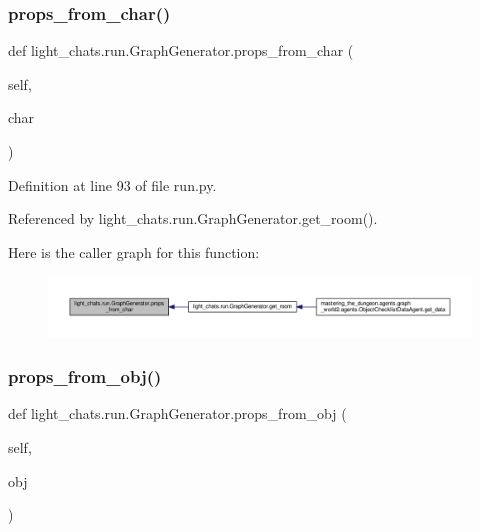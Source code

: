 \subsubsection{\texorpdfstring{props\+\_\+from\+\_\+char()}{props\_from\_char()}}
{\footnotesize\ttfamily def light\+\_\+chats.\+run.\+Graph\+Generator.\+props\+\_\+from\+\_\+char (\begin{DoxyParamCaption}\item[{}]{self,  }\item[{}]{char }\end{DoxyParamCaption})}



Definition at line 93 of file run.\+py.



Referenced by light\+\_\+chats.\+run.\+Graph\+Generator.\+get\+\_\+room().

Here is the caller graph for this function\+:
\nopagebreak
\begin{figure}[H]
\begin{center}
\leavevmode
\includegraphics[width=350pt]{classlight__chats_1_1run_1_1GraphGenerator_a3b33b3e258b5d31a586a43b484bda91c_icgraph}
\end{center}
\end{figure}
\mbox{\label{classlight__chats_1_1run_1_1GraphGenerator_a757544b95a6b132d89a0e27dc98511f4}} 
\subsubsection{\texorpdfstring{props\+\_\+from\+\_\+obj()}{props\_from\_obj()}}
{\footnotesize\ttfamily def light\+\_\+chats.\+run.\+Graph\+Generator.\+props\+\_\+from\+\_\+obj (\begin{DoxyParamCaption}\item[{}]{self,  }\item[{}]{obj }\end{DoxyParamCaption})}



